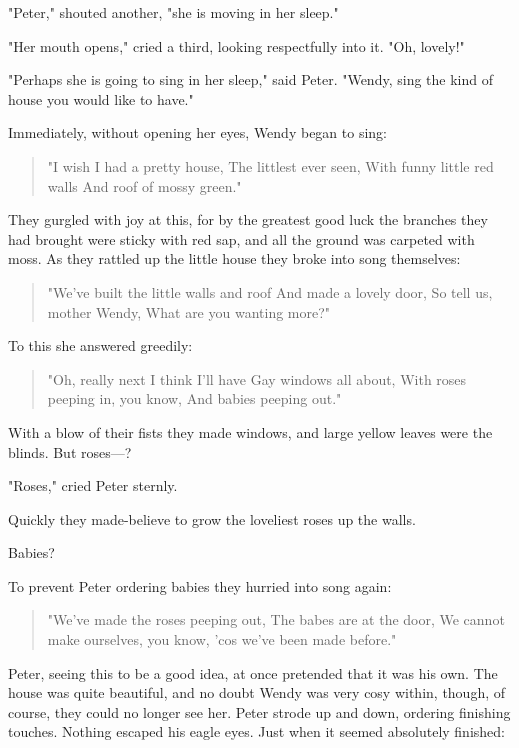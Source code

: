 "Peter," shouted another, "she is moving in her sleep."


"Her mouth opens," cried a third, looking respectfully into it. "Oh,
lovely!"


"Perhaps she is going to sing in her sleep," said Peter. "Wendy, sing the
kind of house you would like to have."


Immediately, without opening her eyes, Wendy began to sing:

\begin{verse}
     "I wish I had a pretty house,
     The littlest ever seen,
     With funny little red walls
     And roof of mossy green."
\end{verse}

They gurgled with joy at this, for by the greatest good luck the branches
they had brought were sticky with red sap, and all the ground was carpeted
with moss. As they rattled up the little house they broke into song
themselves:

\begin{verse}
     "We've built the little walls and roof
     And made a lovely door,
     So tell us, mother Wendy,
     What are you wanting more?"
\end{verse}

To this she answered greedily:

\begin{verse}
     "Oh, really next I think I'll have
     Gay windows all about,
     With roses peeping in, you know,
     And babies peeping out."
\end{verse}

With a blow of their fists they made windows, and large yellow leaves were
the blinds. But roses—?


"Roses," cried Peter sternly.


Quickly they made-believe to grow the loveliest roses up the walls.


Babies?


To prevent Peter ordering babies they hurried into song again:

\begin{verse}
     "We've made the roses peeping out,
     The babes are at the door,
     We cannot make ourselves, you know,
     'cos we've been made before."
\end{verse}

Peter, seeing this to be a good idea, at once pretended that it was his
own. The house was quite beautiful, and no doubt Wendy was very cosy
within, though, of course, they could no longer see her. Peter strode up
and down, ordering finishing touches. Nothing escaped his eagle eyes. Just
when it seemed absolutely finished:



